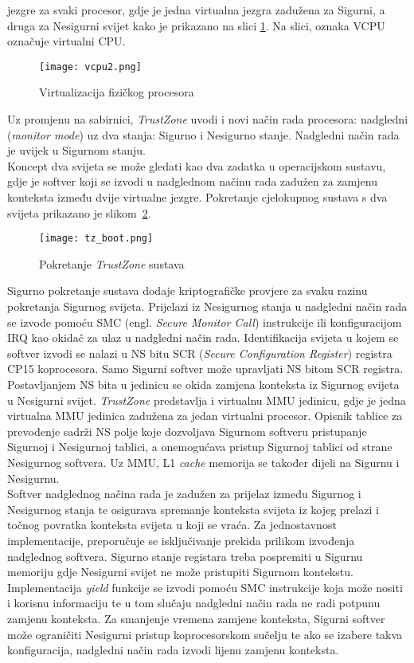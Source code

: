 \documentclass[times, utf8, diplomski, numeric]{fer}
\begin{document}
jezgre za svaki procesor, gdje je jedna virtualna jezgra zadužena za Sigurni, a druga za Nesigurni svijet kako je prikazano na
slici \ref{vcpu}. Na slici, oznaka VCPU označuje virtualni CPU.
\begin{figure}[H]
  \centering
	\texttt{[image: vcpu2.png]}%
	\caption{Virtualizacija fizičkog procesora}
	\label{vcpu}%
\end{figure}
Uz promjenu na
sabirnici, \textit{TrustZone} uvodi i novi način rada procesora: nadgledni (\textit{monitor mode}) uz dva stanja: Sigurno
i Nesigurno stanje. Nadgledni način rada je uvijek u Sigurnom stanju.\\
Koncept dva svijeta se može gledati kao dva zadatka u operacijskom sustavu, gdje je softver koji se izvodi
u nadglednom načinu rada zadužen za zamjenu konteksta između dvije virtualne jezgre. Pokretanje cjelokupnog sustava s dva
svijeta prikazano je slikom~\ref{tz_boot}.
\begin{figure}[H]
  \centering
	\texttt{[image: tz\_boot.png]}%
	\caption{Pokretanje \textit{TrustZone} sustava}
	\label{tz_boot}%
\end{figure}
Sigurno pokretanje sustava dodaje kriptografičke provjere za svaku razinu pokretanja Sigurnog svijeta.
Prijelazi iz Nesigurnog stanja u nadgledni
način rada se izvode pomoću SMC (engl. \textit{Secure Monitor Call}) instrukcije ili konfiguracijom IRQ kao okidač za ulaz
u nadgledni način rada. Identifikacija svijeta u kojem se softver izvodi se nalazi u NS bitu SCR (\textit{Secure
Configuration Register}) registra CP15 koprocesora. Samo Sigurni softver može upravljati NS bitom SCR registra. Postavljanjem
NS bita u jedinicu se okida zamjena konteksta iz Sigurnog svijeta u Nesigurni svijet. \textit{TrustZone} predstavlja i
virtualnu MMU jedinicu, gdje je jedna virtualna MMU jedinica zadužena za jedan virtualni procesor. Opisnik tablice za prevođenje
sadrži NS polje koje dozvoljava Sigurnom softveru pristupanje Sigurnoj i Nesigurnoj tablici, a onemogućava pristup Sigurnoj
tablici od strane Nesigurnog softvera. Uz MMU, L1 \textit{cache} memorija se također dijeli na Sigurnu i Nesigurnu.\\
Softver nadglednog načina rada je zadužen za prijelaz između Sigurnog i Nesigurnog stanja te osigurava spremanje konteksta
svijeta iz kojeg prelazi i točnog povratka konteksta svijeta u koji se vraća. Za jednostavnost implementacije, preporučuje
se isključivanje prekida prilikom izvođenja nadglednog softvera. Sigurno stanje registara treba pospremiti u Sigurnu memoriju
gdje Nesigurni svijet ne može pristupiti Sigurnom kontekstu. Implementacija \textit{yield} funkcije se izvodi pomoću SMC
instrukcije koja može nositi i korisnu informaciju te u tom slučaju nadgledni način rada ne radi potpunu zamjenu konteksta.
Za smanjenje vremena zamjene konteksta, Sigurni softver može ograničiti Nesigurni pristup koprocesorskom sučelju te ako se
izabere takva konfiguracija, nadgledni način rada izvodi lijenu zamjenu konteksta.
\end{document}
